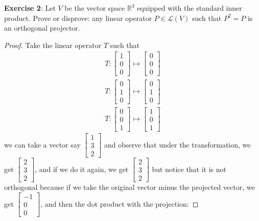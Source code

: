 \documentclass{article}
\begin{document}
\textbf{Exercise 2}: Let $V$ be the vector space $\mathbb{R}^{3}$ equipped with the standard inner product. Prove or disprove: any linear operator $P \in \mathcal{L}(V)$ such that $P^{2} = P$ is an orthogonal projector.
\begin{proof}
	Take the linear operator $T$ such that 
	\begin{align*}
		T: \begin{bmatrix} 1 \\ 0 \\ 0 \end{bmatrix} \mapsto \begin{bmatrix} 0 \\ 0 \\ 0 \end{bmatrix} \\
		T: \begin{bmatrix} 0 \\ 1 \\ 0 \end{bmatrix} \mapsto \begin{bmatrix} 0 \\ 1 \\ 0 \end{bmatrix} \\
		T: \begin{bmatrix} 0 \\ 0 \\ 1 \end{bmatrix} \mapsto \begin{bmatrix} 1 \\ 0 \\ 1 \end{bmatrix}
	\end{align*}
	we can take a vector say $\begin{bmatrix} 1 \\ 3 \\ 2 \end{bmatrix}$ and observe that under the transformation, we get $\begin{bmatrix} 2 \\ 3 \\ 2 \end{bmatrix}$, and if we do it again, we get $\begin{bmatrix} 2 \\ 3 \\ 2 \end{bmatrix}$ but notice that it is not orthogonal because if we take the original vector minus the projected vector, we get $\begin{bmatrix} -1 \\ 0 \\ 0 \end{bmatrix}$, and then the dot product with the projection:

\end{proof}
\end{document}

